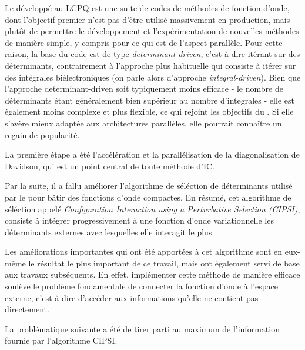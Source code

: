 \documentclass[./thesis.tex]{subfiles}
\begin{document}
Le \QP\cite{QP} développé au LCPQ est une suite de codes de méthodes de fonction d'onde, dont l'objectif premier n'est pas d'être utilisé massivement en production, mais plutôt de permettre le développement et l’expérimentation de nouvelles méthodes de manière simple, y compris pour ce qui est de l'aspect parallèle. Pour cette raison, la base du code est de type \emph{determinant-driven}, c'est à dire itérant sur des déterminants, contrairement à l'approche plus habituelle qui consiste à itérer sur des intégrales biélectroniques (on parle alors d'approche \emph{integral-driven}). Bien que l'approche determinant-driven soit typiquement moins efficace - le nombre de déterminants étant généralement bien supérieur au nombre d'integrales - elle est également moins complexe et plus flexible,\cite{Povill_1995} ce qui rejoint les objectifs du \QP. Si elle s'avère mieux adaptée aux architectures parallèles, elle pourrait connaître un regain de popularité.

La première étape a été l’accélération et la parallélisation de la diagonalisation de Davidson, qui est un point central de toute méthode d'IC. 

Par la suite, il a fallu améliorer l'algorithme de séléction de déterminants utilisé par le \QP pour bâtir des fonctions d'onde compactes. En résumé, cet algorithme de séléction appelé \emph{Configuration Interaction using a Perturbative Selection (CIPSI)},\cite{Huron_1973} consiste à intégrer progressivement à une fonction d'onde variationnelle les déterminants externes avec lesquelles elle interagit le plus.

Les améliorations importantes qui ont été apportées à cet algorithme sont en eux-même le résultat le plus important de ce travail, mais ont également servi de base aux travaux subséquents. En effet, implémenter cette méthode de manière efficace soulève le problème fondamentale de connecter la fonction d'onde à l'espace externe, c'est à dire d’accéder aux informations qu'elle ne contient pas directement. 

La problématique suivante a été de tirer parti au maximum de l'information fournie par l'algorithme CIPSI.
\end{document}
